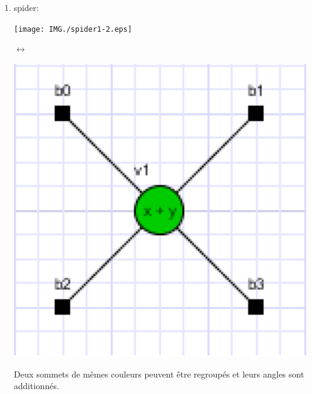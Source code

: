\documentclass[a4paper,oneside]{book}
\begin{document}
\begin{enumerate}
\item spider:\\
\begin{center}
\begin{minipage}[c]{0.25\textwidth}
\texttt{[image: IMG./spider1-2.eps]}
\end{minipage}
\hspace{0.5cm}\Huge{$\longleftrightarrow$}
\begin{minipage}[c]{0.25\textwidth}
\includegraphics[scale=0.6]{IMG/spider2-2.eps}
\end{minipage}
\label{}
\end{center}

Deux sommets de mêmes couleurs peuvent être regroupés et leurs angles sont additionnés.

\newpage


\end{enumerate}
\end{document}
